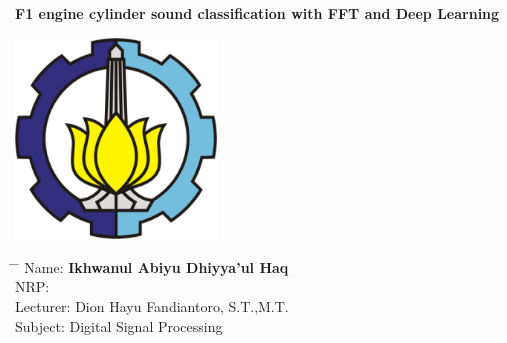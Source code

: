\begin{titlepage}
    \begin{center}
        \Huge
        \textbf{F1 engine cylinder sound classification with FFT and Deep Learning}
        
        
        \vspace{7cm}
        
        \includegraphics[width=0.4\textwidth]{images/its-logo.png}
        
    \end{center}
        \vspace{5cm}
    \Large
    \begin{tabbing}
        \hspace*{1em}\= \hspace*{8em} \= \kill %
        \> Name:\>  \textbf{Ikhwanul Abiyu Dhiyya'ul Haq} \\
        \> NRP: \\
        \> Lecturer:\>  Dion Hayu Fandiantoro, S.T.,M.T.  \\
        \> Subject:\>  Digital Signal Processing  \\
    \end{tabbing}

\end{titlepage}

% 